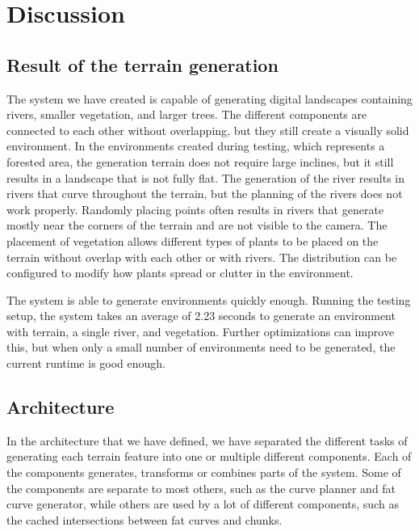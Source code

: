 \section{Discussion}

\subsection{Result of the terrain generation}
The system we have created is capable of generating digital landscapes containing rivers, smaller vegetation, and larger trees. The different components are connected to each other without overlapping, but they still create a visually solid environment.
In the environments created during testing, which represents a forested area, the generation terrain does not require large inclines, but it still results in a landscape that is not fully flat.
The generation of the river results in rivers that curve throughout the terrain, but the planning of the rivers does not work properly. Randomly placing points often results in rivers that generate mostly near the corners of the terrain and are not visible to the camera.
The placement of vegetation allows different types of plants to be placed on the terrain without overlap with each other or with rivers. The distribution can be configured to modify how plants spread or clutter in the environment.

The system is able to generate environments quickly enough. Running the testing setup, the system takes an average of 2.23 seconds to generate an environment with terrain, a single river, and vegetation. Further optimizations can improve this, but when only a small number of environments need to be generated, the current runtime is good enough.


\subsection{Architecture}
In the architecture that we have defined, we have separated the different tasks of generating each terrain feature into one or multiple different components. Each of the components generates, transforms or combines parts of the system. Some of the components are separate to most others, such as the curve planner and fat curve generator, while others are used by a lot of different components, such as the cached intersections between fat curves and chunks.

